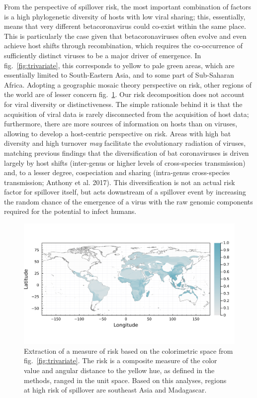 \documentclass[11pt]{article}
\makeatletter
\def\maxwidth{\ifdim\Gin@nat@width>\linewidth\linewidth
\else\Gin@nat@width\fi}
\let\Oldincludegraphics\includegraphics
\renewcommand{\includegraphics}[1]{\Oldincludegraphics[width=\maxwidth]{#1}}
\makeatother
\begin{document}
From the perspective of spillover risk, the most important combination
of factors is a high phylogenetic diversity of hosts with low viral
sharing; this, essentially, means that very different betacoronavirus
could co-exist within the same place. This is particularly the case
given that betacoronaviruses often evolve and even achieve host shifts
through recombination, which requires the co-occurrence of sufficiently
distinct viruses to be a major driver of emergence. In
fig.~\ref{fig:trivariate}, this corresponds to yellow to pale green
areas, which are essentially limited to South-Eastern Asia, and to some
part of Sub-Saharan Africa. Adopting a geographic mosaic theory
perspective on risk, other regions of the world are of lesser concern
fig.~\ref{fig:risk}. Our risk decomposition does not account for viral
diversity or distinctiveness. The simple rationale behind it is that the
acquisition of viral data is rarely disconnected from the acquisition of
host data; furthermore, there are more sources of information on hosts
than on viruses, allowing to develop a host-centric perspective on risk.
Areas with high bat diversity and high turnover \emph{may} facilitate
the evolutionary radiation of viruses, matching previous findings that
the diversification of bat coronaviruses is driven largely by host
shifts (inter-genus or higher levels of cross-species transmission) and,
to a lesser degree, cospeciation and sharing (intra-genus cross-species
transmission; Anthony et al. 2017). This diversification is not an
actual risk factor for spillover itself, but acts downstream of a
spillover event by increasing the random chance of the emergence of a
virus with the raw genomic components required for the potential to
infect humans.

\begin{figure}
\hypertarget{fig:risk}{%
\centering
\includegraphics{figures/risk_map.png}
\caption{Extraction of a measure of risk based on the colorimetric space
from fig.~\ref{fig:trivariate}. The risk is a composite measure of the
color value and angular distance to the yellow hue, as defined in the
methods, ranged in the unit space. Based on this analyses, regions at
high risk of spillover are southeast Asia and
Madagascar.}\label{fig:risk}
}
\end{figure}
\end{document}

